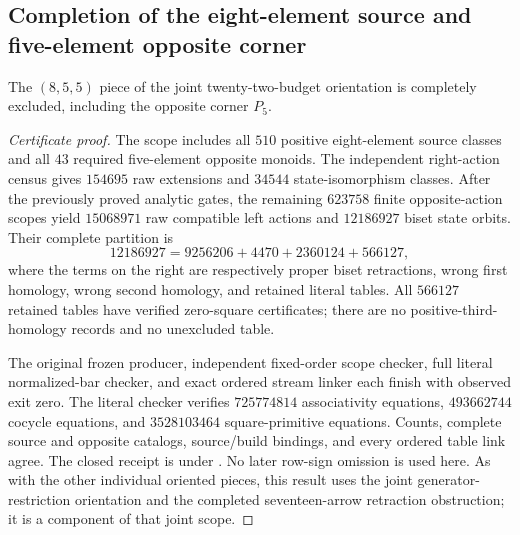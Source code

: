 \subsection{Completion of the eight-element source and five-element opposite corner}

\begin{proposition}
\label{CP2:A-oriented-eighteen-eight-five-five}
The $(8,5,5)$ piece of the joint twenty-two-budget orientation is
completely excluded, including the opposite corner $P_5$.
\end{proposition}
\begin{proof}[Certificate proof]
The scope includes all $510$ positive eight-element source classes and
all $43$ required five-element opposite monoids.  The independent
right-action census gives $154695$ raw extensions and $34544$
state-isomorphism classes.  After the previously proved analytic gates,
the remaining $623758$ finite opposite-action scopes yield $15068971$
raw compatible left actions and $12186927$ biset state orbits.  Their
complete partition is
\[
 12186927=9256206+4470+2360124+566127,
\]
where the terms on the right are respectively proper biset retractions,
wrong first homology, wrong second homology, and retained literal tables.
All $566127$ retained tables have verified zero-square certificates;
there are no positive-third-homology records and no unexcluded table.

The original frozen producer, independent fixed-order scope checker,
full literal normalized-bar checker, and exact ordered stream linker
each finish with observed exit zero.  The literal checker verifies
$725774814$ associativity equations, $493662744$ cocycle equations, and
$3528103464$ square-primitive equations.  Counts, complete source and
opposite catalogs, source/build bindings, and every ordered table link
agree.  The closed receipt is
 under
.
No later row-sign omission is used here.  As with the other individual
oriented pieces, this result uses the joint generator-restriction
orientation and the completed seventeen-arrow retraction obstruction;
it is a component of that joint scope.
\end{proof}
